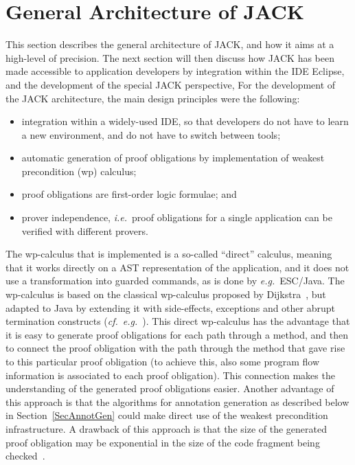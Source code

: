 \section{General Architecture of JACK}\label{SecArchitecture}

This section describes the general architecture of JACK, and how it
aims at a high-level of precision.  The next section will then discuss
how JACK has been made accessible to application developers by
integration within the IDE Eclipse, and the development of the special
JACK perspective, For the development of the JACK architecture, the
main design principles were the following:
\begin{itemize}
\item integration within a widely-used IDE, so that developers do not
have to learn a new environment, and do not have to switch between tools;
\item automatic generation of proof obligations by
implementation of weakest precondition (wp) calculus;
\item proof obligations are first-order logic formulae; and
\item prover independence, \emph{i.e.}\ proof obligations for
a single application can be verified with different provers.
\end{itemize}

The wp-calculus that is implemented is a
so-called ``direct'' calculus, meaning that it works directly on a AST
representation of the application, and it does not use a
transformation into guarded commands, as is done by \emph{e.g.}\
ESC/Java.  The wp-calculus is based on the classical wp-calculus
proposed by Dijkstra~\cite{Dijkstra75}, but adapted to Java by
extending it with side-effects, exceptions and other abrupt
termination constructs (\emph{cf.}\
\emph{e.g.}~\cite{Jacobs04}). This direct wp-calculus has the advantage
that it is easy to generate proof obligations for each path through a
method, and then to connect the proof obligation with the path through
the method that gave rise to this particular proof obligation (to
achieve this, also some program flow information is associated to each
proof obligation). This connection makes the understanding of the
generated proof obligations easier. Another advantage of this approach
is that the algorithms for annotation generation as described below in
Section~\ref{SecAnnotGen} could make direct use of the weakest
precondition infrastructure. A drawback of this approach is that the
size of the generated proof obligation may be exponential in the size
of the code fragment being checked~\cite{FlanaganSaxe01}.


